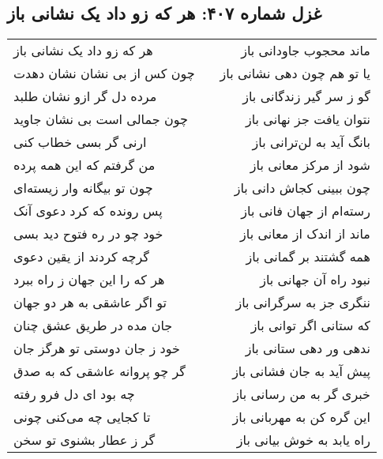 \begin{center}
\section*{غزل شماره ۴۰۷: هر که زو داد یک نشانی باز}
\label{sec:407}
\begin{longtable}{l p{0.5cm} r}
هر که زو داد یک نشانی باز
&&
ماند محجوب جاودانی باز
\\
چون کس از بی نشان نشان دهدت
&&
یا تو هم چون دهی نشانی باز
\\
مرده دل گر ازو نشان طلبد
&&
گو ز سر گیر زندگانی باز
\\
چون جمالی است بی نشان جاوید
&&
نتوان یافت جز نهانی باز
\\
ارنی گر بسی خطاب کنی
&&
بانگ آید به لن‌ترانی باز
\\
من گرفتم که این همه پرده
&&
شود از مرکز معانی باز
\\
چون تو بیگانه وار زیسته‌ای
&&
چون ببینی کجاش دانی باز
\\
پس رونده که کرد دعوی آنک
&&
رسته‌ام از جهان فانی باز
\\
خود چو در ره فتوح دید بسی
&&
ماند از اندک از معانی باز
\\
گرچه کردند از یقین دعوی
&&
همه گشتند بر گمانی باز
\\
هر که را این جهان ز راه ببرد
&&
نبود راه آن جهانی باز
\\
تو اگر عاشقی به هر دو جهان
&&
ننگری جز به سرگرانی باز
\\
جان مده در طریق عشق چنان
&&
که ستانی اگر توانی باز
\\
خود ز جان دوستی تو هرگز جان
&&
ندهی ور دهی ستانی باز
\\
گر چو پروانه عاشقی که به صدق
&&
پیش آید به جان فشانی باز
\\
چه بود ای دل فرو رفته
&&
خبری گر به من رسانی باز
\\
تا کجایی چه می‌کنی چونی
&&
این گره کن به مهربانی باز
\\
گر ز عطار بشنوی تو سخن
&&
راه یابد به خوش بیانی باز
\\
\end{longtable}
\end{center}
